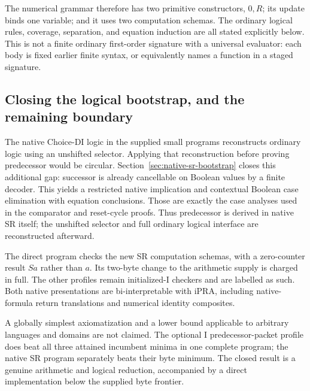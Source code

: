 The numerical grammar therefore has two primitive constructors, $0,R$;
its update binds one variable; and it uses two computation schemas. The
ordinary logical rules, coverage, separation, and equation induction are
all stated explicitly below. This is not a finite ordinary first-order
signature with a universal evaluator: each body is fixed earlier finite
syntax, or equivalently names a function in a staged signature.

\subsection{Closing the logical bootstrap, and the remaining boundary}

The native Choice-DI logic in the supplied small programs reconstructs
ordinary logic using an unshifted selector. Applying that reconstruction
before proving predecessor would be circular. Section~\ref{sec:native-sr-bootstrap}
closes this additional gap: successor is already cancellable on Boolean
values by a finite decoder. This yields a restricted native implication
and contextual Boolean case elimination with equation conclusions.
Those are exactly the case analyses used in the comparator and reset-cycle
proofs. Thus predecessor is derived in native SR itself; the unshifted
selector and full ordinary logical interface are reconstructed afterward.

The direct program  checks the new SR
computation schemas, with a zero-counter result $Sa$ rather than $a$.
Its two-byte change to the arithmetic supply is charged in full. The
other profiles remain initialized-I checkers and are labelled as such.
Both native presentations are bi-interpretable with iPRA, including
native-formula return translations and numerical identity composites.

A globally simplest axiomatization and a lower bound applicable to arbitrary
languages and domains are not claimed. The optional I predecessor-packet
profile does beat all three attained incumbent minima in one complete
program; the native SR program separately beats their byte minimum. The closed result is a genuine
arithmetic and logical reduction, accompanied by a direct implementation
below the supplied byte frontier.
